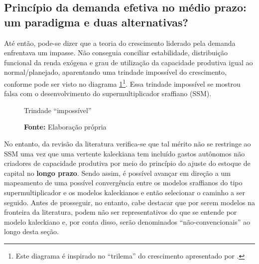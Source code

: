 \subsection{Princípio da demanda efetiva no médio prazo: um paradigma e duas alternativas?}
\label{Medium}

Até então, pode-se dizer que a teoria do crescimento liderado pela demanda enfrentava um impasse. Não conseguia conciliar estabilidade, distribuição funcional da renda exógena e grau de utilização da capacidade produtiva igual ao normal/planejado, aparentando uma trindade impossível do crescimento, conforme pode ser visto no diagrama \ref{diagrama}\footnote{Este diagrama é inspirado no ``trilema'' do crescimento apresentado por \textcite{cesaratto_neo-kaleckian_2015}.}.
Essa trindade impossível se mostrou falsa com o desenvolvimento do supermultiplicador sraffiano (SSM).

\begin{figure}[H]
	\caption{Trindade ``impossível''}
	\label{diagrama}
	\begin{center}
	\end{center}
	\caption*{\textbf{Fonte:} Elaboração própria}
\end{figure}
No entanto, da revisão da literatura verifica-se que tal mérito não se restringe ao SSM uma vez que uma vertente kaleckiana tem incluído gastos autônomos não criadores de capacidade produtiva por meio do princípio do ajuste do estoque de capital no \textbf{longo prazo}.
Sendo assim, é possível avançar em direção a um mapeamento de uma possível convergência entre os modelos sraffianos do tipo supermultiplicador e os modelos kaleckianos e então selecionar o caminho a ser seguido.
Antes de prosseguir, no entanto, cabe destacar que por serem modelos na fronteira da literatura, podem não ser representativos do que se entende por modelo kaleckiano e, por conta disso, serão denominados ``não-convencionais'' ao longo desta seção.

